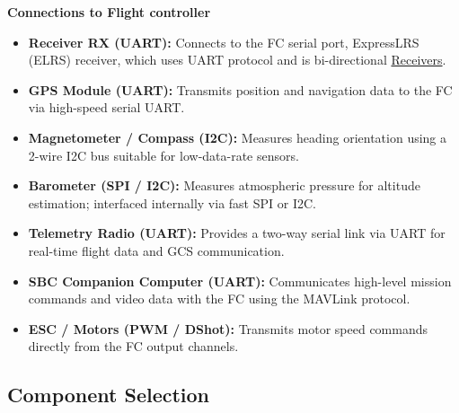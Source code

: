 \documentclass[11pt,a4paper]{article}
\begin{document}
\textbf{Connections to Flight controller}
\begin{itemize}
    \item \textbf{Receiver RX (UART):} Connects to the FC serial port, ExpressLRS (ELRS) receiver, which uses UART protocol and is bi-directional \href{https://ardupilot.org/copter/docs/common-smartap-pdb.html}{Receivers}.
    \item \textbf{GPS Module (UART):} Transmits position and navigation data to the FC via high-speed serial UART.
    \item \textbf{Magnetometer / Compass (I2C):} Measures heading orientation using a 2-wire I2C bus suitable for low-data-rate sensors.
    \item \textbf{Barometer (SPI / I2C):} Measures atmospheric pressure for altitude estimation; interfaced internally via fast SPI or I2C.
    \item \textbf{Telemetry Radio (UART):} Provides a two-way serial link via UART for real-time flight data and GCS communication.
    \item \textbf{SBC Companion Computer (UART):} Communicates high-level mission commands and video data with the FC using the MAVLink protocol.
    \item \textbf{ESC / Motors (PWM / DShot):} Transmits motor speed commands directly from the FC output channels.
\end{itemize}


\subsection{Component Selection}

\renewcommand{\arraystretch}{1.4}
\end{document}
